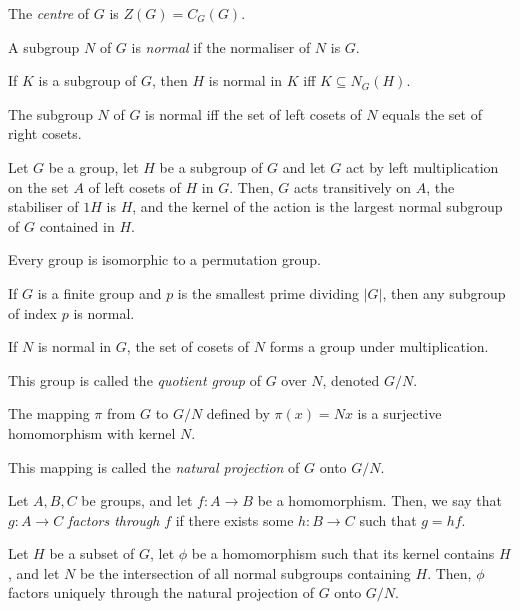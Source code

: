 \begin{defn}
    The \emph{centre} of $G$ is $Z(G)=C_G(G)$.
\end{defn}
\begin{defn}
    A subgroup $N$ of $G$ is \emph{normal} if the normaliser of $N$ is $G$.
\end{defn}
\begin{prop}
    If $K$ is a subgroup of $G$, then $H$ is normal in $K$ iff $K\subseteq
    N_G(H)$.
\end{prop}
\begin{prop}
    The subgroup $N$ of $G$ is normal iff the set of left cosets of $N$ equals
    the set of right cosets.
\end{prop}
\begin{prop}
    Let $G$ be a group, let $H$ be a subgroup of $G$ and let $G$ act by left
    multiplication on the set $A$ of left cosets of $H$ in $G$. Then, $G$ acts
    transitively on $A$, the stabiliser of $1H$ is $H$, and the kernel of the
    action is the largest normal subgroup of $G$ contained in $H$.
\end{prop}
\begin{cor}[Cayley]
    Every group is isomorphic to a permutation group.
\end{cor}
\begin{prop}
    If $G$ is a finite group and $p$ is the smallest prime dividing $|G|$, then
    any subgroup of index $p$ is normal.
\end{prop}
\begin{prop}
    If $N$ is normal in $G$, the set of cosets of $N$ forms a group under
    multiplication.
\end{prop}
\begin{defn}
    This group is called the \emph{quotient group} of $G$ over $N$, denoted
    $G/N$.
\end{defn}
\begin{prop}
    The mapping $\pi$ from $G$ to $G/N$ defined by $\pi(x)=Nx$ is a
    surjective homomorphism with kernel $N$.
\end{prop}
\begin{defn}
    This mapping is called the \emph{natural projection} of $G$ onto $G/N$.
\end{defn}
\begin{defn}
    Let $A,B,C$ be groups, and let $f:A\to B$ be a homomorphism. Then, we say
    that $g:A\to C$ \emph{factors through} $f$ if there exists some $h:B\to C$
    such that $g=hf$.
\end{defn}
\begin{prop}
    Let $H$ be a subset of $G$, let $\phi$ be a homomorphism such that its
    kernel contains $H$, and let $N$ be the intersection of all normal
    subgroups containing $H$. Then, $\phi$ factors uniquely through the natural
    projection of $G$ onto $G/N$.
\end{prop}
